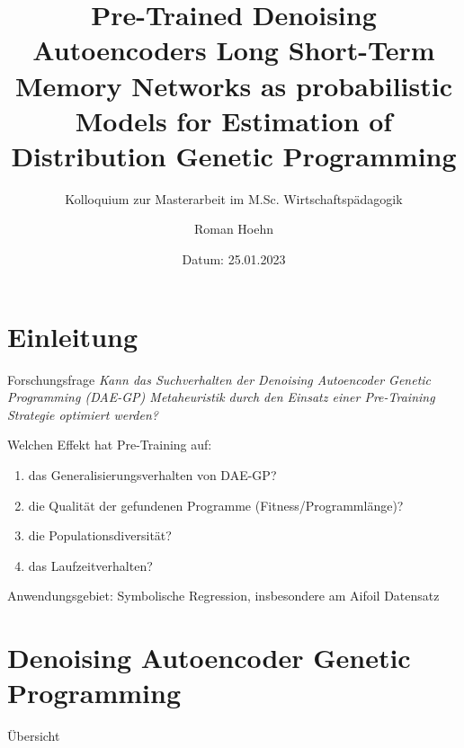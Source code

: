 \documentclass[
  ignorenonframetext,
]{beamer}
\title{Pre-Trained Denoising Autoencoders Long Short-Term Memory
Networks as probabilistic Models for Estimation of Distribution Genetic
Programming}
\subtitle{Kolloquium zur Masterarbeit im M.Sc. Wirtschaftspädagogik}
\author{Roman Hoehn}
\date{Datum: 25.01.2023}
\institute{Johannes Gutenberg-Universität Mainz}
\providecommand{\tightlist}{%
  \setlength{\itemsep}{0pt}\setlength{\parskip}{0pt}}
\begin{document}
\frame{\titlepage}

\begin{frame}[allowframebreaks]
  \tableofcontents[hideallsubsections]
\end{frame}
\hypertarget{einleitung}{%
\section{Einleitung}\label{einleitung}}

\begin{frame}{Forschungsfrage}
\protect\hypertarget{forschungsfrage}{}
\emph{Kann das Suchverhalten der Denoising Autoencoder Genetic
Programming (DAE-GP) Metaheuristik durch den Einsatz einer Pre-Training
Strategie optimiert werden?}

Welchen Effekt hat Pre-Training auf:

\begin{enumerate}
\tightlist
\item
  das Generalisierungsverhalten von DAE-GP?
\item
  die Qualität der gefundenen Programme (Fitness/Programmlänge)?
\item
  die Populationsdiversität?
\item
  das Laufzeitverhalten?
\end{enumerate}

Anwendungsgebiet: Symbolische Regression, insbesondere am Aifoil
Datensatz
\end{frame}

\hypertarget{denoising-autoencoder-genetic-programming}{%
\section{Denoising Autoencoder Genetic
Programming}\label{denoising-autoencoder-genetic-programming}}

\begin{frame}{Übersicht}
\protect\hypertarget{uxfcbersicht}{}
\end{frame}
\end{document}
